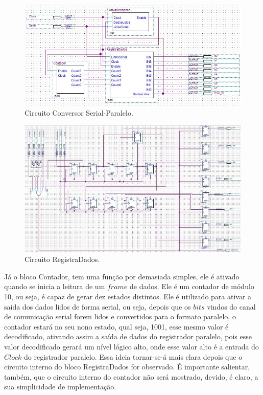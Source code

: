 \documentclass[12pt]{article}
\begin{document}
\begin{figure}[h]
\centering
\includegraphics[width=1\textwidth]{img/p4/aa2.jpg}
\caption{Circuito Conversor Serial-Paralelo.}
\label{fig:aa2}
\end{figure}

\begin{figure}[h]
\centering
\includegraphics[width=1\textwidth]{img/p4/aa1.jpg}
\caption{Circuito RegistraDados.}
\label{fig:fsm}
\end{figure}


Já o bloco Contador, tem uma função por demasiada simples, ele é ativado quando se inicia a leitura de um $frame$ de dados. Ele é um contador de módulo 10, ou seja, é capaz de gerar dez estados distintos. Ele é utilizado para ativar a saída dos dados lidos de forma serial, ou seja, depois que os $bits$ vindos do canal de comunicação serial forem lidos e convertidos para o formato paralelo, o contador estará no seu nono estado, qual seja, 1001, esse mesmo valor é decodificado, ativando assim a saída de dados do registrador paralelo, pois esse valor decodificado gerará um nível lógico alto, onde esse valor alto é a entrada do $Clock$ do registrador paralelo. Essa ideia tornar-se-á mais clara depois que o circuito interno do bloco RegistraDados for observado. É importante salientar, também, que o circuito interno do contador não será mostrado, devido, é claro, a sua simplicidade de implementação.
\end{document}
